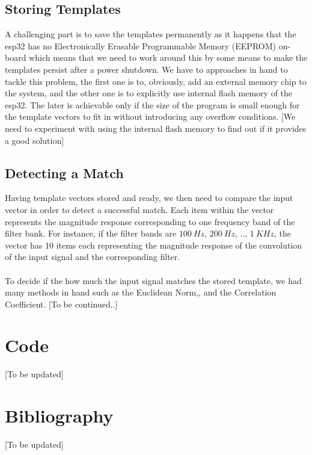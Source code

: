 \documentclass{article}
\begin{document}
	\subsection{Storing Templates}
	\label{subsec:storing templates}
	A challenging part is to save the templates permanently 
	as it happens that the esp32 has no Electronically Erasable Programmable Memory (EEPROM) on-board which means that we need to work around this by some means to make the templates persist after a power shutdown. We have to approaches in hand to tackle this problem, the first one is to, obviously, add an external memory chip to the system, and the other one is to explicitly use internal flash memory of the esp32. The later is achievable only if the size of the program is small enough for the template vectors to fit in without introducing any overflow conditions. [We need to experiment with using the internal flash memory to find out if it provides a good solution]  
	\subsection{Detecting a Match}		\label{subsec:detecting a match}
	Having template vectors stored and ready, we then need to compare the input vector in order to detect a successful match. Each item within the vector represents the magnitude response corresponding to one frequency band of the filter bank. For instance, if the filter bands are $100~Hz$, $200~Hz$, .., $1~KHz$, the vector has 10 items each representing the magnitude response of the convolution of the input signal and the corresponding filter. \\\\
	To decide if the how much the input signal matches the stored template, we had many methods in hand such as the Euclidean Norm,, and the Correlation Coefficient. [To be continued..]	
	

	\section{Code}
	\label{sec:code}
	[To be updated]
   
	
% 	

\section{Bibliography}
\label{sec:bibliography}
[To be updated]
\end{document}
